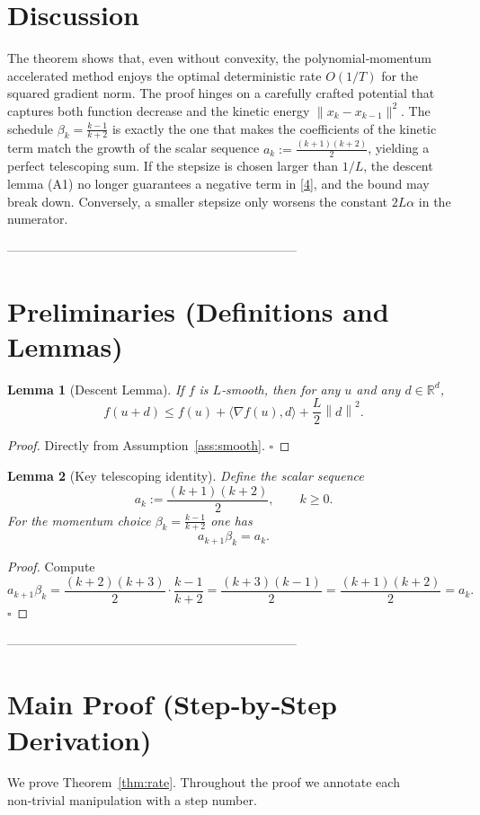 \documentclass{article}
\newtheorem{lemma}{Lemma}
\newcommand{\norm}[1]{\left\lVert#1\right\rVert}
\newcommand{\grad}{\nabla}
\begin{document}
\section*{Discussion}
The theorem shows that, even without convexity, the polynomial‑momentum
accelerated method enjoys the optimal deterministic rate $O(1/T)$ for the
squared gradient norm.  The proof hinges on a carefully crafted potential that
captures both function decrease and the kinetic energy $\|x_k-x_{k-1}\|^2$.
The schedule $\beta_k=\frac{k-1}{k+2}$ is exactly the one that makes the
coefficients of the kinetic term match the growth of the scalar sequence
$a_k:=\frac{(k+1)(k+2)}{2}$, yielding a perfect telescoping sum.  If the stepsize
is chosen larger than $1/L$, the descent lemma (A1) no longer guarantees a
negative term in \eqref{4}, and the bound may break down.  Conversely,
a smaller stepsize only worsens the constant $2L\alpha$ in the numerator.

---------------------------------------------------------------------

\section*{Preliminaries (Definitions and Lemmas)}
\begin{lemma}[Descent Lemma]\label{lem:descent}
If $f$ is $L$‑smooth, then for any $u$ and any $d\in\mathbb{R}^d$,
\[
f(u+d)\le f(u)+\langle\grad f(u),d\rangle+\frac{L}{2}\norm{d}^2 .
\]
\end{lemma}
\begin{proof}
Directly from Assumption~\ref{ass:smooth}. \hfill $\square$
\end{proof}

\begin{lemma}[Key telescoping identity]\label{lem:telescoping}
Define the scalar sequence
\[
a_k:=\frac{(k+1)(k+2)}{2},\qquad k\ge0 .
\]
For the momentum choice $\beta_k=\frac{k-1}{k+2}$ one has
\[
a_{k+1}\beta_k = a_k .
\tag{5}
\]
\end{lemma}
\begin{proof}
Compute
\[
a_{k+1}\beta_k
=\frac{(k+2)(k+3)}{2}\cdot\frac{k-1}{k+2}
=\frac{(k+3)(k-1)}{2}
=\frac{(k+1)(k+2)}{2}=a_k .
\]
\hfill $\square$
\end{proof}

---------------------------------------------------------------------

\section*{Main Proof (Step‑by‑Step Derivation)}
We prove Theorem~\ref{thm:rate}.  Throughout the proof we annotate each
non‑trivial manipulation with a step number.
\end{document}
